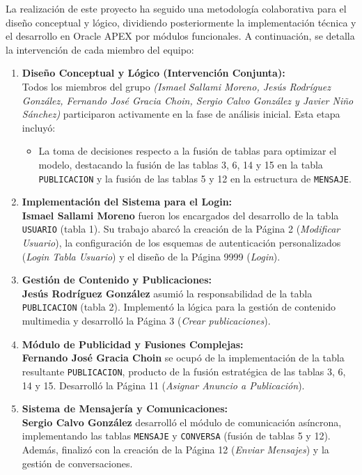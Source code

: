 
La realización de este proyecto ha seguido una metodología colaborativa para el diseño conceptual y lógico, dividiendo posteriormente la implementación técnica y el desarrollo en Oracle APEX por módulos funcionales. A continuación, se detalla la intervención de cada miembro del equipo:

\begin{enumerate}
    \item \textbf{Diseño Conceptual y Lógico (Intervención Conjunta):} \\
    Todos los miembros del grupo \textit{(Ismael Sallami Moreno, Jesús Rodríguez González, Fernando José Gracia Choin, Sergio Calvo González y Javier Niño Sánchez)} participaron activamente en la fase de análisis inicial. Esta etapa incluyó:
    \begin{itemize}
        \item La toma de decisiones respecto a la fusión de tablas para optimizar el modelo, destacando la fusión de las tablas 3, 6, 14 y 15 en la tabla \texttt{PUBLICACION} y la fusión de las tablas 5 y 12 en la estructura de \texttt{MENSAJE}.
    \end{itemize}

    \item \textbf{Implementación del Sistema para el Login:} \\
    \textbf{Ismael Sallami Moreno} fueron los encargados del desarrollo de la tabla \texttt{USUARIO} (tabla 1). Su trabajo abarcó la creación de la Página 2 (\textit{Modificar Usuario}), la configuración de los esquemas de autenticación personalizados (\textit{Login Tabla Usuario}) y el diseño de la Página 9999 (\textit{Login}).

    \item \textbf{Gestión de Contenido y Publicaciones:} \\
    \textbf{Jesús Rodríguez González} asumió la responsabilidad de la tabla \texttt{PUBLICACION} (tabla 2). Implementó la lógica para la gestión de contenido multimedia y desarrolló la Página 3 (\textit{Crear publicaciones}).

    \item \textbf{Módulo de Publicidad y Fusiones Complejas:} \\
    \textbf{Fernando José Gracia Choin} se ocupó de la implementación de la tabla resultante \texttt{PUBLICACION}, producto de la fusión estratégica de las tablas 3, 6, 14 y 15. Desarrolló la Página 11 (\textit{Asignar Anuncio a Publicación}).

    \item \textbf{Sistema de Mensajería y Comunicaciones:} \\
    \textbf{Sergio Calvo González} desarrolló el módulo de comunicación asíncrona, implementando las tablas \texttt{MENSAJE} y \texttt{CONVERSA} (fusión de tablas 5 y 12). Además, finalizó con la creación de la Página 12 (\textit{Enviar Mensajes}) y la gestión de conversaciones.


\end{enumerate}
